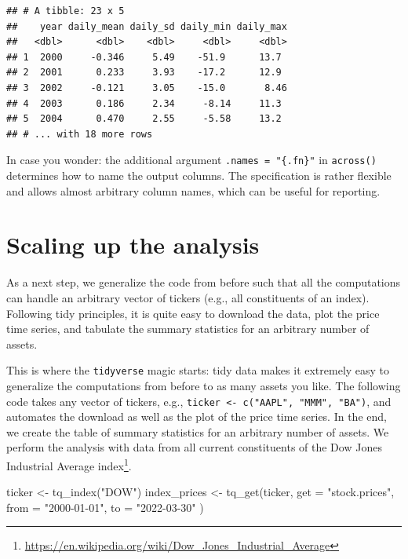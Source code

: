\documentclass[
]{book}
\newenvironment{Shaded}{\begin{snugshade}}{\end{snugshade}}
\newcommand{\AttributeTok}[1]{\textcolor[rgb]{0.61,0.61,0.61}{#1}}
\newcommand{\FunctionTok}[1]{\textcolor[rgb]{0,0,0}{#1}}
\newcommand{\NormalTok}[1]{#1}
\newcommand{\OtherTok}[1]{\textcolor[rgb]{0.37,0.37,0.37}{#1}}
\newcommand{\StringTok}[1]{\textcolor[rgb]{0.5,0.5,0.5}{#1}}
\renewcommand{\href}[2]{#2\footnote{\url{#1}}}
\begin{document}
\begin{verbatim}
## # A tibble: 23 x 5
##    year daily_mean daily_sd daily_min daily_max
##   <dbl>      <dbl>    <dbl>     <dbl>     <dbl>
## 1  2000     -0.346     5.49    -51.9      13.7 
## 2  2001      0.233     3.93    -17.2      12.9 
## 3  2002     -0.121     3.05    -15.0       8.46
## 4  2003      0.186     2.34     -8.14     11.3 
## 5  2004      0.470     2.55     -5.58     13.2 
## # ... with 18 more rows
\end{verbatim}

In case you wonder: the additional argument \texttt{.names\ =\ "\{.fn\}"} in \texttt{across()} determines how to name the output columns. The specification is rather flexible and allows almost arbitrary column names, which can be useful for reporting.

\hypertarget{scaling-up-the-analysis}{%
\section{Scaling up the analysis}\label{scaling-up-the-analysis}}

As a next step, we generalize the code from before such that all the computations can handle an arbitrary vector of tickers (e.g., all constituents of an index). Following tidy principles, it is quite easy to download the data, plot the price time series, and tabulate the summary statistics for an arbitrary number of assets.

This is where the \texttt{tidyverse} magic starts: tidy data makes it extremely easy to generalize the computations from before to as many assets you like. The following code takes any vector of tickers, e.g., \texttt{ticker\ \textless{}-\ c("AAPL",\ "MMM",\ "BA")}, and automates the download as well as the plot of the price time series. In the end, we create the table of summary statistics for an arbitrary number of assets. We perform the analysis with data from all current constituents of the \href{https://en.wikipedia.org/wiki/Dow_Jones_Industrial_Average}{Dow Jones Industrial Average index}.

\begin{Shaded}
\begin{Highlighting}[]
\NormalTok{ticker }\OtherTok{\textless{}{-}} \FunctionTok{tq\_index}\NormalTok{(}\StringTok{"DOW"}\NormalTok{)}
\NormalTok{index\_prices }\OtherTok{\textless{}{-}} \FunctionTok{tq\_get}\NormalTok{(ticker,}
  \AttributeTok{get =} \StringTok{"stock.prices"}\NormalTok{,}
  \AttributeTok{from =} \StringTok{"2000{-}01{-}01"}\NormalTok{,}
  \AttributeTok{to =} \StringTok{"2022{-}03{-}30"}
\NormalTok{)}
\end{Highlighting}
\end{Shaded}
\end{document}
